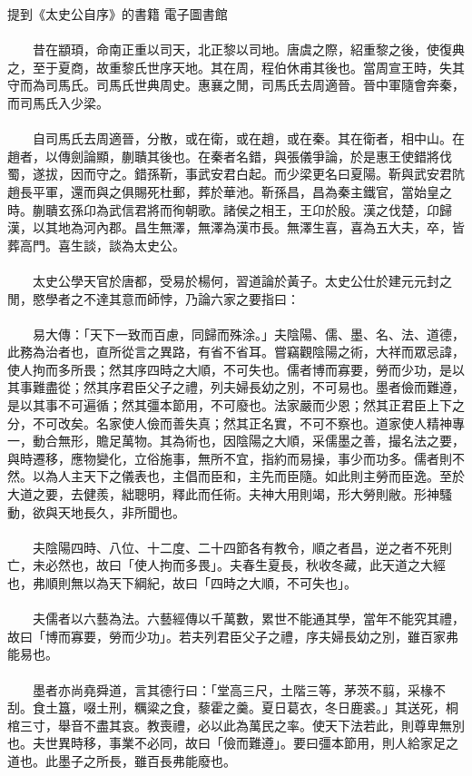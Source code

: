 提到《太史公自序》的書籍 電子圖書館
\\\\
　　昔在顓頊，命南正重以司天，北正黎以司地。唐虞之際，紹重黎之後，使復典之，至于夏商，故重黎氏世序天地。其在周，程伯休甫其後也。當周宣王時，失其守而為司馬氏。司馬氏世典周史。惠襄之閒，司馬氏去周適晉。晉中軍隨會奔秦，而司馬氏入少梁。
\\\\
　　自司馬氏去周適晉，分散，或在衛，或在趙，或在秦。其在衛者，相中山。在趙者，以傳劍論顯，蒯聵其後也。在秦者名錯，與張儀爭論，於是惠王使錯將伐蜀，遂拔，因而守之。錯孫靳，事武安君白起。而少梁更名曰夏陽。靳與武安君阬趙長平軍，還而與之俱賜死杜郵，葬於華池。靳孫昌，昌為秦主鐵官，當始皇之時。蒯聵玄孫卬為武信君將而徇朝歌。諸侯之相王，王卬於殷。漢之伐楚，卬歸漢，以其地為河內郡。昌生無澤，無澤為漢市長。無澤生喜，喜為五大夫，卒，皆葬高門。喜生談，談為太史公。
\\\\
　　太史公學天官於唐都，受易於楊何，習道論於黃子。太史公仕於建元元封之閒，愍學者之不達其意而師悖，乃論六家之要指曰：
\\\\
　　易大傳：「天下一致而百慮，同歸而殊涂。」夫陰陽、儒、墨、名、法、道德，此務為治者也，直所從言之異路，有省不省耳。嘗竊觀陰陽之術，大祥而眾忌諱，使人拘而多所畏；然其序四時之大順，不可失也。儒者博而寡要，勞而少功，是以其事難盡從；然其序君臣父子之禮，列夫婦長幼之別，不可易也。墨者儉而難遵，是以其事不可遍循；然其彊本節用，不可廢也。法家嚴而少恩；然其正君臣上下之分，不可改矣。名家使人儉而善失真；然其正名實，不可不察也。道家使人精神專一，動合無形，贍足萬物。其為術也，因陰陽之大順，采儒墨之善，撮名法之要，與時遷移，應物變化，立俗施事，無所不宜，指約而易操，事少而功多。儒者則不然。以為人主天下之儀表也，主倡而臣和，主先而臣隨。如此則主勞而臣逸。至於大道之要，去健羨，絀聰明，釋此而任術。夫神大用則竭，形大勞則敝。形神騷動，欲與天地長久，非所聞也。
\\\\
　　夫陰陽四時、八位、十二度、二十四節各有教令，順之者昌，逆之者不死則亡，未必然也，故曰「使人拘而多畏」。夫春生夏長，秋收冬藏，此天道之大經也，弗順則無以為天下綱紀，故曰「四時之大順，不可失也」。
\\\\
　　夫儒者以六藝為法。六藝經傳以千萬數，累世不能通其學，當年不能究其禮，故曰「博而寡要，勞而少功」。若夫列君臣父子之禮，序夫婦長幼之別，雖百家弗能易也。
\\\\
　　墨者亦尚堯舜道，言其德行曰：「堂高三尺，土階三等，茅茨不翦，采椽不刮。食土簋，啜土刑，糲粱之食，藜霍之羹。夏日葛衣，冬日鹿裘。」其送死，桐棺三寸，舉音不盡其哀。教喪禮，必以此為萬民之率。使天下法若此，則尊卑無別也。夫世異時移，事業不必同，故曰「儉而難遵」。要曰彊本節用，則人給家足之道也。此墨子之所長，雖百長弗能廢也。
